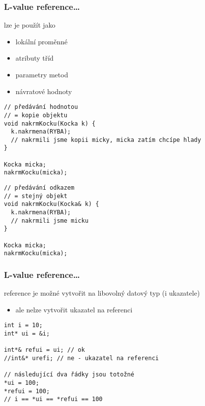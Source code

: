 \begin{frame}[fragile]
\frametitle{L-value reference\ldots}
\begin{bitemize}
\item lze je použít jako
\begin{itemize}
\item lokální proměnné
\item atributy tříd
\item parametry metod
\item návratové hodnoty
\end{itemize}
\end{bitemize}

\begin{twocols}
\begin{yesblock}
\begin{lstlisting}[basicstyle=\scriptsize]
// předávání hodnotou
// = kopie objektu
void nakrmKocku(Kocka k) {
  k.nakrmena(RYBA);
  // nakrmili jsme kopii micky, micka zatím chcípe hlady  
}

Kocka micka;
nakrmKocku(micka);
\end{lstlisting}
\end{yesblock}

\twocolssep

\begin{yesblock}
\begin{lstlisting}[basicstyle=\scriptsize]
// předávání odkazem
// = stejný objekt
void nakrmKocku(Kocka& k) {
  k.nakrmena(RYBA);
  // nakrmili jsme micku
}

Kocka micka;
nakrmKocku(micka);
\end{lstlisting}
\end{yesblock}

\end{twocols}
\end{frame}






\begin{frame}[fragile]
\frametitle{L-value reference\ldots}

\begin{bitemize}
\item reference je možné vytvořit na libovolný datový typ (i ukazatele)
\begin{itemize}
\item ale nelze vytvořit ukazatel na referenci
\end{itemize}
\end{bitemize}

\begin{yesblock}
\begin{lstlisting}
int i = 10;
int* ui = &i;

int*& refui = ui; // ok
//int&* urefi; // ne - ukazatel na referenci

// následující dva řádky jsou totožné
*ui = 100;
*refui = 100;
// i == *ui == *refui == 100
\end{lstlisting}
\end{yesblock}
\end{frame}





